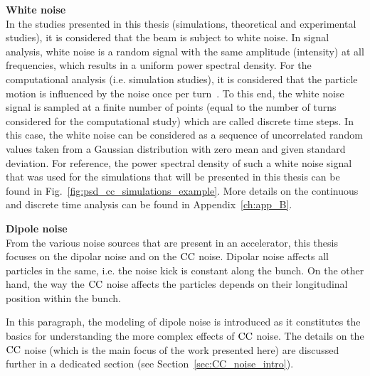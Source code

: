 \textbf{White noise}\\
In the studies presented in this thesis (simulations, theoretical and experimental studies), it is considered that the beam is subject to white noise. In signal analysis, white noise is a random signal with the same amplitude (intensity) at all frequencies, which results in a uniform power spectral density. For the computational analysis (i.e. simulation studies), it is considered that the particle motion is influenced by the noise once per turn~\cite{Lebedev:248620, Lebedev:248622, PhysRevSTAB.18.101001}. To this end, the white noise signal is sampled at a finite number of points (equal to the number of turns considered for the computational study) which are called discrete time steps. In this case, the white noise can be considered as a sequence of uncorrelated random values taken from a Gaussian distribution with zero mean and given standard deviation. For reference, the power spectral density of such a white noise signal that was used for the simulations that will be presented in this thesis can be found in Fig.~\ref{fig:psd_cc_simulations_example}. More details on the continuous and discrete time analysis can be found in Appendix~\ref{ch:app_B}. %



\textbf{Dipole noise}\\
From the various noise sources that are present in an accelerator, this thesis focuses on the dipolar noise and on the ${\mathrm{CC}}$ noise. Dipolar noise affects all particles in the same, i.e. the noise kick is constant along the bunch.
On the other hand, the way the ${\mathrm{CC}}$ noise affects the particles depends on their longitudinal position within the bunch. 

In this paragraph, the modeling of dipole noise is introduced as it constitutes the basics for understanding the more complex effects of ${\mathrm{CC}}$ noise. The details on the ${\mathrm{CC}}$ noise (which is the main focus of the work presented here) are discussed further in a dedicated section (see Section~\ref{sec:CC_noise_intro}). 

